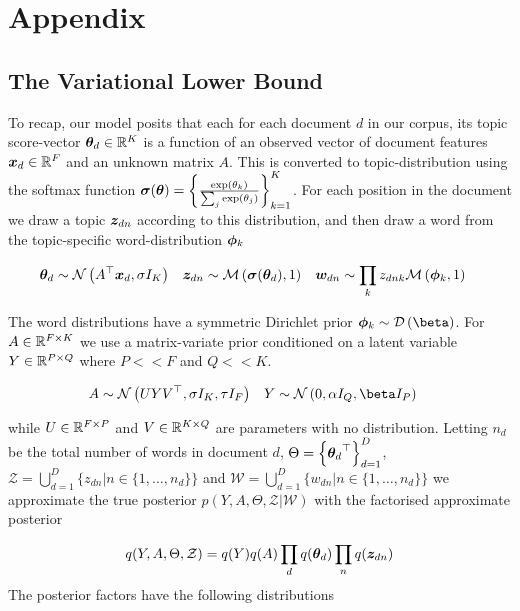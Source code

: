 
\newcommand \ed { { \vv{\xi}_d } }
\newcommand \bd { { \vv{b}_d   } }

\section{Appendix}

\subsection{The Variational Lower Bound}
To recap, our model posits that each for each document $d$ in our corpus, its topic score-vector ${ \bm \theta_d } \in { \mathbb{R}^{K} }$ is a function of an observed vector of document features ${ \bm x_d } \in { \mathbb{R}^{F} }$ and an unknown matrix $A$. This is converted to topic-distribution using the softmax function $\bm \sigma(\bm \theta) = \left\{ \frac{\exp(\theta_k)}{\sum_j \exp(\theta_j)} \right\}_{k=1}^K$. For each position in the document we draw a topic ${ \bm z_{dn} }$ according to this distribution, and then draw a word from the topic-specific word-distribution ${ \bm \phi_k }$

\begin{align}
{  \bm \theta _d } &\sim \mathcal{N} \left( {A^\top{  \bm x _d }}, {\sigma I_K} \right) &
{ \bm z_{dn} } &\sim \mathcal{M} \left( {\bm \sigma({ \bm \theta_d })},{1} \right) & 
{ \bm w_{dn} } &\sim \prod_k z_{dnk} \mathcal{M} \left( {{ \bm \phi_k }},{1} \right)
\end{align}

The word distributions have a symmetric Dirichlet prior $\pk \sim \dir{\vv{\beta}}$. For $A \in { \mathbb{R}^{F \times K} }$ we use a matrix-variate prior conditioned on a latent variable $Y \in { \mathbb{R}^{P \times Q} }$ where $P << F$ and $Q << K$.

\begin{align}
A &\sim \mnor{UYV\T}{\sigma I_K}{\tau I_F} &
Y &\sim \mnor{0}{\alpha I_Q}{\beta I_P}
\end{align}

while $U \in { \mathbb{R}^{F \times P} }$ and $V \in { \mathbb{R}^{K \times Q} }$ are parameters with no distribution. Letting $n_d$ be the total number of words in document $d$, $\Theta = \left\{ { \bm \theta_d }^\top \right\}_{d=1}^D$, $\mathcal{Z} = \bigcup_{d=1}^D \{ z_{dn} | n \in \{1, \ldots, n_d \} \}$ and $\mathcal{W} = \bigcup_{d=1}^D \{ w_{dn} | n \in \{1, \ldots, n_d \} \}$ we approximate the true posterior $p(Y, A, \Theta, \mathcal{Z} | \mathcal{W})$ with the factorised approximate posterior


\begin{align}
q(Y, A, \Theta, \mathcal{Z}) = q(Y)q(A)\prod_d q({ \bm \theta_d }) \prod_n q({ \bm z_{dn} })
\end{align}
The posterior factors have the following distributions

